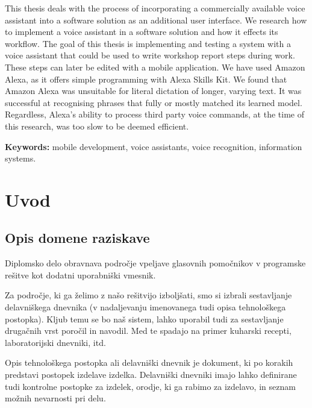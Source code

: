 \documentclass[a4paper, 12pt]{book}
\newcommand{\tkeywordsEn}{mobile development, voice assistants, voice recognition, information systems}
\newcommand{\clearemptydoublepage}{\newpage{\pagestyle{empty}\cleardoublepage}}
\begin{document}
\noindent This thesis deals with the process of incorporating a commercially available voice assistant into a software solution as an additional user interface.
We research how to implement a voice assistant in a software solution and how it effects its workflow.
The goal of this thesis is implementing and testing a system with a voice assistant that could be used to write workshop report steps during work.
These steps can later be edited with a mobile application.
We have used Amazon Alexa, as it offers simple programming with Alexa Skills Kit.
We found that Amazon Alexa was unsuitable for literal dictation of longer, varying text.
It was successful at recognising phrases that fully or mostly matched its learned model.
Regardless, Alexa's ability to process third party voice commands, at the time of this research, was too slow to be deemed efficient.

\bigskip

\noindent\textbf{Keywords:} \tkeywordsEn.
\clearemptydoublepage

\mainmatter
\setcounter{page}{1}
\pagestyle{fancy}

\chapter{Uvod}
\section{Opis domene raziskave}

Diplomsko delo obravnava področje vpeljave glasovnih pomočnikov v programske rešitve kot dodatni uporabniški vmesnik.

Za področje, ki ga želimo z našo rešitvijo  izboljšati, smo si izbrali sestavljanje delavniškega dnevnika (v nadaljevanju imenovanega tudi opisa tehnološkega postopka).
Kljub temu se bo naš sistem, lahko uporabil tudi za sestavljanje drugačnih vrst poročil in navodil.
Med te spadajo na primer kuharski recepti, laboratorijski dnevniki, itd.

Opis tehnološkega postopka ali delavniški dnevnik je dokument, ki po korakih predstavi postopek izdelave izdelka.
Delavniški dnevniki imajo lahko definirane tudi kontrolne postopke za izdelek, orodje, ki ga rabimo za izdelavo, in seznam možnih nevarnosti pri delu.
\end{document}
